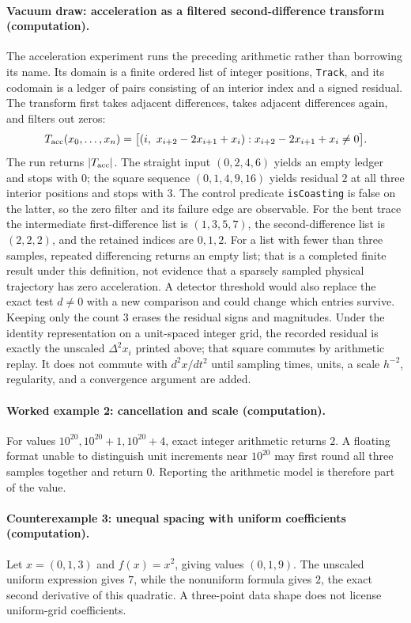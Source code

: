 \paragraph{Vacuum draw: acceleration as a filtered second-difference transform (computation).}
The acceleration experiment runs the preceding arithmetic rather than borrowing its name.  Its domain is a finite
ordered list of integer positions, \texttt{Track}, and its codomain is a ledger of pairs consisting of an interior index and
a signed residual.  The transform first takes adjacent differences, takes adjacent differences again, and filters out
zeros:
\[
 T_{\rm acc}(x_0,\ldots,x_n)
 =\bigl[(i,\ x_{i+2}-2x_{i+1}+x_i):
             x_{i+2}-2x_{i+1}+x_i\ne0\bigr].
\]
The run returns \(|T_{\rm acc}|\).  The straight input \((0,2,4,6)\) yields an empty ledger and stops with \(0\);
the square sequence \((0,1,4,9,16)\) yields residual \(2\) at all three interior positions and stops with \(3\).
The control predicate \texttt{isCoasting} is false on the latter, so the zero filter and its failure edge are observable.
For the bent trace the intermediate first-difference list is \((1,3,5,7)\), the second-difference list is
\((2,2,2)\), and the retained indices are \(0,1,2\).  For a list with fewer than three samples, repeated differencing
returns an empty list; that is a completed finite result under this definition, not evidence that a sparsely sampled
physical trajectory has zero acceleration.  A detector threshold would also replace the exact test \(d\ne0\) with a
new comparison and could change which entries survive.
Keeping only the count \(3\) erases the residual signs and magnitudes.  Under the identity representation on a
unit-spaced integer grid, the recorded residual is exactly
the unscaled \(\Delta^2x_i\) printed above; that square commutes by arithmetic replay.  It does not commute with
\(d^2x/dt^2\) until sampling times, units, a scale \(h^{-2}\), regularity, and a convergence argument are added.

\paragraph{Worked example 2: cancellation and scale (computation).}
For values \(10^{20},10^{20}+1,10^{20}+4\), exact integer arithmetic returns \(2\).  A floating format unable to
distinguish unit increments near \(10^{20}\) may first round all three samples together and return \(0\).  Reporting
the arithmetic model is therefore part of the value.

\paragraph{Counterexample 3: unequal spacing with uniform coefficients (computation).}
Let \(x=(0,1,3)\) and \(f(x)=x^2\), giving values \((0,1,9)\).  The unscaled uniform expression gives \(7\), while
the nonuniform formula gives \(2\), the exact second derivative of this quadratic.  A three-point data shape does not
license uniform-grid coefficients.

